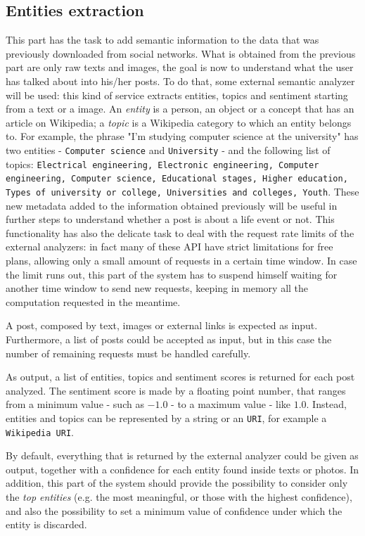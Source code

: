 \subsection{Entities extraction}
This part has the task to add semantic information to the data that was previously downloaded from social networks. What is obtained from the previous part are only raw texts and images, the goal is now to understand what the user has talked about into his/her posts. To do that, some external semantic analyzer will be used: this kind of service extracts entities, topics and sentiment starting from a text or a image. An \textit{entity} is a person, an object or a concept that has an article on Wikipedia; a \textit{topic} is a Wikipedia category to which an entity belongs to. For example, the phrase "I'm studying computer science at the university" has two entities - \texttt{Computer science} and \texttt{University} - and the following list of topics: \texttt{Electrical engineering, Electronic engineering, Computer engineering, Computer science, Educational stages, Higher education, Types of university or college, Universities and colleges, Youth}. These new metadata added to the information obtained previously will be useful in further steps to understand whether a post is about a life event or not. This functionality has also the delicate task to deal with the request rate limits of the external analyzers: in fact many of these API have strict limitations for free plans, allowing only a small amount of requests in a certain time window. In case the limit runs out, this part of the system has to suspend himself waiting for another time window to send new requests, keeping in memory all the computation requested in the meantime.

A post, composed by text, images or external links is expected as input. Furthermore, a list of posts could be accepted as input, but in this case the number of remaining requests must be handled carefully.

As output, a list of entities, topics and sentiment scores is returned for each post analyzed. The sentiment score is made by a floating point number, that ranges from a minimum value - such as $ -1.0 $ - to a maximum value - like $ 1.0 $. Instead, entities and topics can be represented by a string or an \texttt{URI}, for example a \texttt{Wikipedia URI}.

By default, everything that is returned by the external analyzer could be given as output, together with a confidence for each entity found inside texts or photos. In addition, this part of the system should provide the possibility to consider only the \textit{top entities} (e.g. the most meaningful, or those with the highest confidence), and also the possibility to set a minimum value of confidence under which the entity is discarded.


